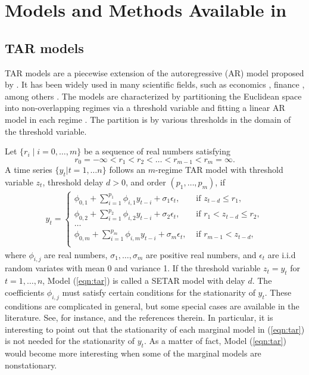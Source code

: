 \section{Models and Methods Available in } \label{sec:models}
\subsection{TAR models}
TAR models are a piecewise extension of the autoregressive (AR) model proposed by \cite{tong1978}. It has been widely used in many scientific fields, such as economics  \citep{tong1980,tiao1989}, finance \citep{domian1997,narayan2006}, among others \citep{chen1995a}.  The models are characterized by partitioning the Euclidean space into non-overlapping regimes
via a threshold variable and fitting a linear AR model in each regime \citep{li2016}. The
partition is by various thresholds in the domain of the threshold variable.

Let $\{ r_i \mid i=0,\ldots,m\}$ be a sequence of real numbers satisfying
\[
r_0=-\infty <r_1<r_2<\ldots <r_{m-1}<r_m=\infty.
\]
A time series $\{y_t| t=1,\ldots n\}$ follows an $m$-regime TAR model with threshold variable $z_t$, threshold delay $d>0$, and order $(p_1,\ldots,p_m)$, if
\begin{eqnarray}\label{eqn:tar}
y_t=\left\{
\begin{array}{ll}
\phi_{0,1}+\sum_{i=1}^{p_1} \phi_{i,1}y_{t-i}+\sigma_1 \epsilon_t, &\mbox{ if } z_{t-d} \leq r_1,\\
\phi_{0,2}+\sum_{i=1}^{p_2} \phi_{i,2}y_{t-i}+\sigma_2 \epsilon_t, &\mbox{ if } r_1< z_{t-d} \leq r_2,\\
\ldots\\
\phi_{0,m}+\sum_{i=1}^{p_m} \phi_{i,m}y_{t-i}+\sigma_m \epsilon_t, &\mbox{ if } r_{m-1}<z_{t-d},\\
\end{array}
\right.
\end{eqnarray}
where $\phi_{i,j}$ are real numbers, $\sigma_1,\ldots,\sigma_m$ are positive real numbers, and $\epsilon_t$ are i.i.d random variates with mean 0 and variance 1. If the threshold variable $z_t=y_t$ for $t=1,\ldots, n$, Model (\ref{eqn:tar}) is called a SETAR model with delay $d$. The coefficients $\phi_{i,j}$ must satisfy certain conditions for the
stationarity of  $y_t$. These conditions are complicated in general,
but some special cases are available in the
literature. See, for instance, \cite{chen1991} and the references therein. In particular, it is
interesting to point out that the stationarity of each marginal model in (\ref{eqn:tar}) is not
needed for the stationarity of $y_t$. As a matter of fact, Model (\ref{eqn:tar}) would
become more interesting when some of the marginal models are nonstationary.


